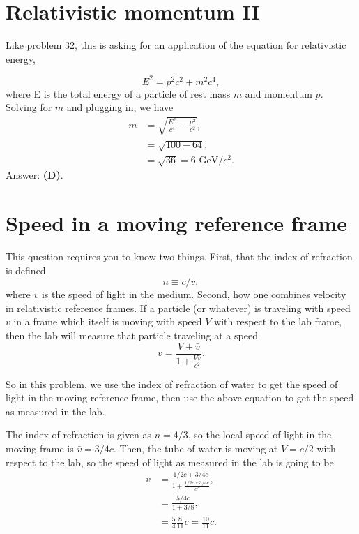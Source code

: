 \documentclass[11pt]{paper}
\newcommand{\answer}[1]{Answer: \textbf{(#1)}.}
\begin{document}
\section{Relativistic momentum II}
Like problem \hyperlink{section.32}{32}, this is asking for an application of the equation for relativistic energy,

\begin{equation}
E^2 = p^2c^2 + m^2c^4,
\end{equation}
where E is the total energy of a particle of rest mass $m$ and momentum $p$.  Solving for $m$ and plugging in, we have 
\begin{align}
m &= \sqrt{\frac{E^2}{c^4}-\frac{p^2}{c^2}},\\
&= \sqrt{100-64},\\
&=\sqrt{36} = 6\text{ GeV}/c^2.
\end{align}
\answer{D}

\section{Speed in a moving reference frame}
This question requires you to know two things.  First, that the index of refraction is defined
\begin{equation}
n\equiv c/v,
\end{equation}
where $v$ is the speed of light in the medium.  Second, how one combines velocity in relativistic reference frames.  If a particle (or whatever) is traveling with speed $\bar{v}$ in a frame which itself is moving with speed $V$ with respect to the lab frame, then the lab will measure that particle traveling at a speed
\begin{equation}
v = \frac{V + \bar{v}}{1+\frac{V\bar{v}}{c^2}}.
\end{equation}

So in this problem, we use the index of refraction of water to get the speed of light in the moving reference frame, then use the above equation to get the speed as measured in the lab.

The index of refraction is given as $n = 4/3$, so the local speed of light in the moving frame is $\bar{v} = 3/4 c$.  Then, the tube of water is moving at $V = c/2$ with respect to the lab, so the speed of light as measured in the lab is going to be
\begin{align}
v &= \frac{1/2c + 3/4c}{1+\frac{1/2c\times3/4 c}{c^2}},\\
&= \frac{5/4c}{1+3/8},\\
&=\frac{5}{4}\frac{8}{11}c =\frac{10}{11}c.
\end{align}
\end{document}

